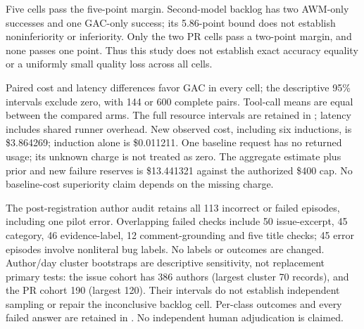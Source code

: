 \begin{table}[htbp]
\centering\small

\caption{Primary exact-answer successes over scheduled records. AWM denotes
the offline API-task adaptation. $100U$ is the simultaneous conservative
accuracy-loss bound in percentage points, not an observed accuracy difference.
NI uses the registered five-point margin.}
\label{tab:generalization-accuracy}
\end{table}

Five cells pass the five-point margin. Second-model backlog has two AWM-only
successes and one GAC-only success; its 5.86-point bound does not establish
noninferiority or inferiority. Only the two PR cells pass a two-point margin,
and none passes one point. Thus this study does not establish exact accuracy
equality or a uniformly small quality loss across all cells.

\begin{table}[htbp]
\centering\small
\setlength{\tabcolsep}{3pt}

\caption{Observed deployment resources per attempted primary episode;
USD/1k scales estimated cost to 1,000 episodes, excluding induction. Savings
are relative to adapted AWM. Both compared arms have complete usage in every
cell. Frozen API prices are estimates, not provider invoices.}
\label{tab:generalization-resources}
\end{table}

Paired cost and latency differences favor GAC in every cell; the descriptive
95\% intervals exclude zero, with 144 or 600 complete pairs. Tool-call means
are equal between the compared arms. The full resource intervals are retained
in ; latency includes shared runner overhead. New observed
cost, including six inductions, is \$3.864269; induction alone is \$0.011211.
One baseline request has no returned usage; its unknown charge is not treated
as zero. The aggregate estimate plus prior and new failure reserves is
\$13.441321 against the authorized \$400 cap. No baseline-cost superiority
claim depends on the missing charge.

The post-registration author audit retains all 113 incorrect or failed
episodes, including one pilot error. Overlapping failed checks include 50
issue-excerpt, 45 category, 46 evidence-label, 12 comment-grounding and five
title checks; 45 error episodes involve nonliteral bug labels. No labels or
outcomes are changed. Author/day cluster bootstraps are descriptive sensitivity,
not replacement primary tests: the issue cohort has 386 authors (largest
cluster 70 records), and the PR cohort 190 (largest 120). Their intervals do
not establish independent sampling or repair the inconclusive backlog cell.
Per-class outcomes and every failed answer are retained in
. No independent human adjudication is claimed.

